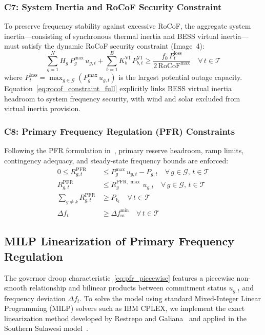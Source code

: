 \documentclass[journal]{IEEEtran}
\begin{document}
\subsubsection{C7: System Inertia and RoCoF Security Constraint}
To preserve frequency stability against excessive RoCoF, the aggregate system inertia---consisting of synchronous thermal inertia and BESS virtual inertia---must satisfy the dynamic RoCoF security constraint (Image~4):
\begin{equation}
  \sum_{g=1}^{N} H_g\,P_g^{\max}\,u_{g,t} + \sum_{b=1}^{B} K_b^{\text{VI}}\,P_{b,t}^{\text{VI}} \geq \frac{f_0\,P^{\text{loss}}_t}{2\,\text{RoCoF}^{\max}} \quad \forall\,t \in \mathcal{T}
  \label{eq:rocof_constraint_full}
\end{equation}
where $P^{\text{loss}}_t = \max_{g \in \mathcal{G}} (P_g^{\max}\,u_{g,t})$ is the largest potential outage capacity. Equation~\eqref{eq:rocof_constraint_full} explicitly links BESS virtual inertia headroom to system frequency security, with wind and solar excluded from virtual inertia provision.

\subsubsection{C8: Primary Frequency Regulation (PFR) Constraints}
Following the PFR formulation in~\cite{E02Sulawesi}, primary reserve headroom, ramp limits, contingency adequacy, and steady-state frequency bounds are enforced:
\begin{align}
  0 \leq R_{g,t}^{\text{PFR}} &\leq P_g^{\max}\,u_{g,t} - P_{g,t} \quad \forall\,g \in \mathcal{G},\,t \in \mathcal{T}
  \label{eq:pfr_headroom_con} \\
  R_{g,t}^{\text{PFR}} &\leq R_g^{\text{PFR},\max}\,u_{g,t} \quad \forall\,g \in \mathcal{G},\,t \in \mathcal{T}
  \label{eq:pfr_ramp_con} \\
  \sum_{g \neq k} R_{g,t}^{\text{PFR}} &\geq P_{k_t} \quad \forall\,t \in \mathcal{T}
  \label{eq:pfr_adequacy} \\
  \Delta f_t &\geq \Delta f_{\text{ss}}^{\min} \quad \forall\,t \in \mathcal{T}
  \label{eq:pfr_dft_limit}
\end{align}

\subsection{MILP Linearization of Primary Frequency Regulation}

The governor droop characteristic~\eqref{eq:pfr_piecewise} features a piecewise non-smooth relationship and bilinear products between commitment status $u_{g,t}$ and frequency deviation $\Delta f_t$. To solve the model using standard Mixed-Integer Linear Programming (MILP) solvers such as IBM CPLEX, we implement the exact linearization method developed by Restrepo and Galiana~\cite{Restrepo2005} and applied in the Southern Sulawesi model~\cite{E02Sulawesi}.
\end{document}
